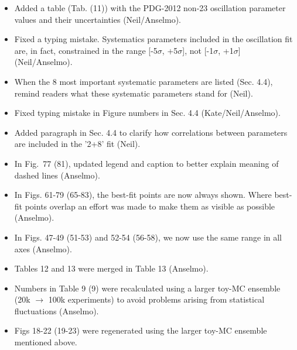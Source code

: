 \begin{itemize}
\item
Added a table (Tab. {\color{red}(11)}) 
with the PDG-2012 non-23 oscillation parameter values and their 
uncertainties (Neil/Anselmo). \checkmark

\item
Fixed a typing mistake.
Systematics parameters included in the oscillation fit are, in fact, constrained in the range
[-5$\sigma$, +5$\sigma$], not [-1$\sigma$, +1$\sigma$] (Neil/Anselmo). \checkmark

\item
When the 8 most important systematic parameters are listed (Sec. 4.4), 
remind readers what these systematic parameters stand for (Neil). \checkmark

\item
Fixed typing mistake in Figure numbers in Sec. 4.4 (Kate/Neil/Anselmo). \checkmark

\item
Added paragraph in Sec. 4.4 to clarify how correlations between parameters are
included in the '2+8' fit (Neil). \checkmark

\item
In Fig.\ 77 {\color{red}(81)},
updated legend and caption to better explain meaning of dashed lines (Anselmo). \checkmark


\item 
In Figs. 61-79 {\color{red}(65-83)}, the best-fit points are now always shown.
Where best-fit points overlap an effort was made to make them as visible as possible (Anselmo). \checkmark

\item
In Figs. 47-49 {\color{red}(51-53)} and 52-54 {\color{red}(56-58)},
we now use the same range in all axes (Anselmo). \checkmark

\item
Tables 12 and 13 were merged in Table  {\color{red}13} (Anselmo). \checkmark

\item
Numbers in Table 9 {\color{red}(9)} 
were recalculated using a larger toy-MC ensemble
(20k $\rightarrow$ 100k experiments) to avoid problems arising from statistical fluctuations (Anselmo). \checkmark

\item
Figs 18-22 {\color{red}(19-23)} were regenerated using the larger toy-MC ensemble mentioned above. \checkmark


\end{itemize}
